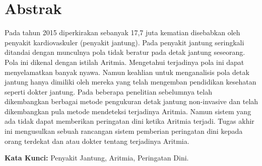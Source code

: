 \chapter*{Abstrak}

Pada tahun 2015 diperkirakan sebanyak 17,7 juta kematian disebabkan oleh penyakit kardiovaskuler (penyakit jantung).  Pada penyakit jantung seringkali ditandai dengan munculnya pola tidak beratur pada detak jantung seseorang. Pola ini dikenal dengan istilah Aritmia. Mengetahui terjadinya pola ini dapat menyelamatkan banyak nyawa. Namun keahlian untuk menganalisis pola detak jantung hanya dimiliki oleh mereka yang telah mengemban pendidikan kesehatan seperti dokter jantung. Pada beberapa penelitian sebelumnya telah dikembangkan berbagai metode pengukuran detak jantung non-invasive dan telah dikembangkan pula metode mendeteksi terjadinya Aritmia. Namun sistem yang ada tidak dapat memberikan peringatan dini ketika Aritmia terjadi. Tugas akhir ini mengusulkan sebuah rancangan sistem pemberian peringatan dini kepada orang terdekat dan atau dokter tentang terjadinya Aritmia.
  
\vspace{0.5 cm}
\begin{flushleft}
{\textbf{Kata Kunci:} Penyakit Jantung, Aritmia, Peringatan Dini.}
\end{flushleft}